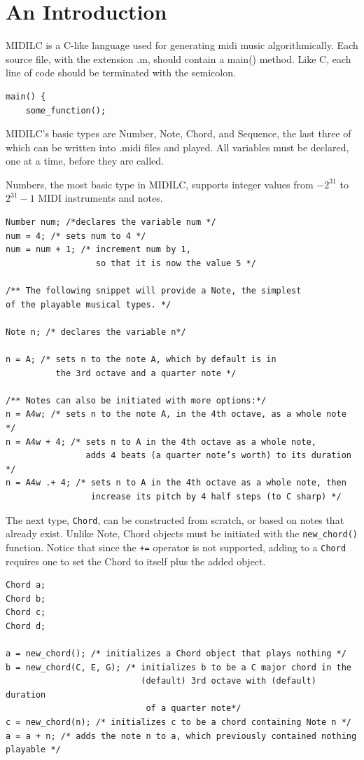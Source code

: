 \documentclass[12pt,A4]{book}
\begin{document}
\section{An Introduction}
MIDILC is a C-like language used for generating midi music algorithmically. Each source file, with the extension .m, should contain a main() method. Like C, each line of code should be terminated with the semicolon.
\begin{verbatim}
main() {
    some_function();
\end{verbatim}

MIDILC’s basic types are Number, Note, Chord, and Sequence, the last three of which can be written into .midi files and played. All variables must be declared, one at a time, before they are called.

Numbers, the most basic type in MIDILC, supports integer values from $-2^{31}$ to $2^{31}-1$ MIDI instruments and notes.

\begin{verbatim}
Number num; /*declares the variable num */
num = 4; /* sets num to 4 */
num = num + 1; /* increment num by 1, 
                  so that it is now the value 5 */

/** The following snippet will provide a Note, the simplest 
of the playable musical types. */

Note n; /* declares the variable n*/

n = A; /* sets n to the note A, which by default is in 
          the 3rd octave and a quarter note */

/** Notes can also be initiated with more options:*/
n = A4w; /* sets n to the note A, in the 4th octave, as a whole note */
n = A4w + 4; /* sets n to A in the 4th octave as a whole note, 
                adds 4 beats (a quarter note’s worth) to its duration */
n = A4w .+ 4; /* sets n to A in the 4th octave as a whole note, then 
                 increase its pitch by 4 half steps (to C sharp) */
\end{verbatim}

The next type, \verb|Chord|, can be constructed from scratch, or based on notes that already exist. Unlike Note, Chord objects must be initiated with the \verb|new_chord()| function. Notice that since the \verb|+=| operator is not supported, adding to a \verb|Chord| requires one to set the Chord to itself plus the added object.

\begin{verbatim}
Chord a;
Chord b;
Chord c;
Chord d;

a = new_chord(); /* initializes a Chord object that plays nothing */
b = new_chord(C, E, G); /* initializes b to be a C major chord in the 
                           (default) 3rd octave with (default) duration 
                            of a quarter note*/
c = new_chord(n); /* initializes c to be a chord containing Note n */
a = a + n; /* adds the note n to a, which previously contained nothing playable */
\end{verbatim}
\end{document}
